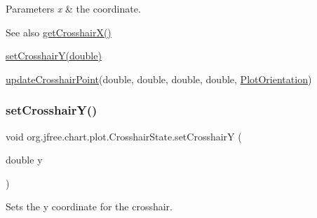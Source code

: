 \begin{DoxyParams}{Parameters}
{\em x} & the coordinate.\\
\hline
\end{DoxyParams}
\begin{DoxySeeAlso}{See also}
\mbox{\hyperlink{classorg_1_1jfree_1_1chart_1_1plot_1_1_crosshair_state_a76091d57e88b55dfdd83fef54fcdf453}{get\+Crosshair\+X()}} 

\mbox{\hyperlink{classorg_1_1jfree_1_1chart_1_1plot_1_1_crosshair_state_a477e48de63a6cbc6fb019c8f7537b26a}{set\+Crosshair\+Y(double)}} 

\mbox{\hyperlink{classorg_1_1jfree_1_1chart_1_1plot_1_1_crosshair_state_abaabe9519089405293d06a56ffdd4f39}{update\+Crosshair\+Point}}(double, double, double, double, \mbox{\hyperlink{classorg_1_1jfree_1_1chart_1_1plot_1_1_plot_orientation}{Plot\+Orientation}}) 
\end{DoxySeeAlso}
\mbox{\label{classorg_1_1jfree_1_1chart_1_1plot_1_1_crosshair_state_a477e48de63a6cbc6fb019c8f7537b26a}} 
\subsubsection{\texorpdfstring{set\+Crosshair\+Y()}{setCrosshairY()}}
{\footnotesize\ttfamily void org.\+jfree.\+chart.\+plot.\+Crosshair\+State.\+set\+CrosshairY (\begin{DoxyParamCaption}\item[{double}]{y }\end{DoxyParamCaption})}

Sets the y coordinate for the crosshair.


